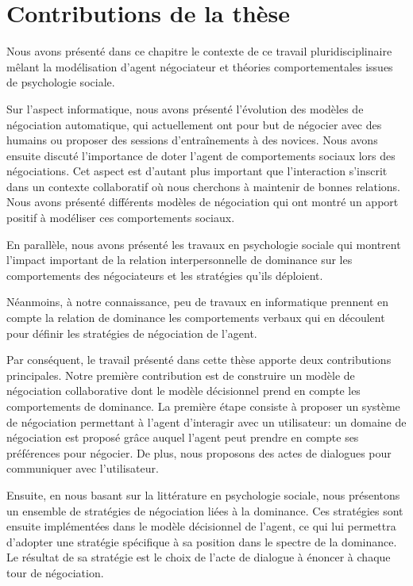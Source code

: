 	
		
\section{Contributions de la thèse}
	Nous avons présenté dans ce chapitre le contexte de ce travail pluridisciplinaire mêlant la modélisation d'agent négociateur et théories comportementales issues de psychologie sociale. 
	
	Sur l'aspect informatique, nous avons présenté l'évolution des modèles de négociation automatique, qui actuellement ont pour but de négocier avec des humains ou proposer des sessions d'entraînements à des novices. 			 
	Nous avons ensuite discuté l'importance de doter l'agent de comportements sociaux lors des négociations. Cet aspect est d'autant plus important que l'interaction s'inscrit dans un contexte collaboratif où nous cherchons à maintenir de bonnes relations. Nous avons présenté différents modèles de négociation qui ont montré un apport positif à modéliser ces comportements sociaux. 
	
	En parallèle, nous avons présenté les travaux en psychologie sociale qui montrent l'impact important de la relation interpersonnelle de dominance sur les comportements des négociateurs et les stratégies qu'ils déploient.
	
	Néanmoins, à notre connaissance, peu de travaux en informatique prennent en compte la relation de dominance les comportements verbaux qui en découlent pour définir les stratégies de négociation de l'agent.
	
	Par conséquent, le travail présenté dans cette thèse apporte deux contributions principales.
	Notre première contribution est de construire un modèle de négociation collaborative dont le modèle décisionnel prend en compte les comportements de dominance. 
	La première étape consiste à proposer un système de négociation permettant à l'agent d'interagir avec un utilisateur: un domaine de négociation est proposé grâce auquel l'agent peut prendre en compte ses préférences pour négocier. De plus, nous proposons des actes de dialogues pour communiquer avec l'utilisateur.
	
	Ensuite, en nous basant sur la littérature en psychologie sociale, nous présentons un ensemble de stratégies de négociation liées à la dominance.
	Ces stratégies sont ensuite implémentées dans le modèle décisionnel de l'agent, ce qui lui permettra d'adopter une stratégie spécifique à sa position dans le spectre de la dominance.  Le résultat de sa stratégie est le choix de l'acte de dialogue à énoncer à chaque tour de négociation.
	
